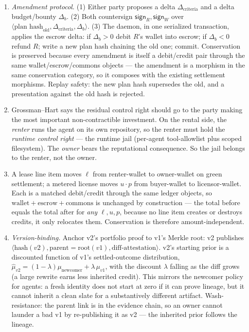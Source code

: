 \begin{enumerate}[label=\textbf{IV.\arabic*},leftmargin=2.8em,itemsep=8pt,topsep=4pt]
\item \wbopen\wbstar \emph{Amendment protocol.} (1) Either party proposes a delta
  $\Delta_{\text{criteria}}$ and a delta budget/bounty $\Delta_b$. (2) Both
  countersign $\mathsf{sign}_R,\mathsf{sign}_W$ over $\langle \text{plan hash}_{\text{old}},
  \Delta_{\text{criteria}}, \Delta_b\rangle$. (3) The daemon, in one serialized
  transaction, applies the escrow delta: if $\Delta_b>0$ debit $R$'s wallet into
  escrow; if $\Delta_b<0$ refund $R$; write a new plan hash chaining the old one;
  commit. Conservation is preserved because every amendment is itself a debit/credit
  pair through the same wallet/escrow/commons objects --- the amendment is a morphism
  in the same conservation category, so it composes with the existing settlement
  morphisms. Replay safety: the new plan hash supersedes the old, and a presentation
  against the old hash is rejected.

\item \wbcheck Grossman--Hart says the residual control right should go to the party
  making the most important non-contractible investment. On the rental side, the
  \emph{renter} runs the agent on its own repository, so the renter must hold the
  \emph{runtime control right} --- the runtime jail (per-agent tool-allowlist plus
  scoped filesystem). The \emph{owner} bears the reputational consequence. So the
  jail belongs to the renter, not the owner.

\item \wbtrace A lease line item moves $\ell$ from renter-wallet to owner-wallet on
  green settlement; a metered license moves $u\cdot p$ from buyer-wallet to
  licensor-wallet. Each is a matched debit/credit through the same ledger objects, so
  $\text{wallet}+\text{escrow}+\text{commons}$ is unchanged by construction --- the
  total before equals the total after for \emph{any} $\ell, u, p$, because no line
  item creates or destroys credits, it only relocates them. Conservation is therefore
  amount-independent.

\item \wbopen\wbstar \emph{Version-binding.} Anchor v2's portfolio proof to v1's
  Merkle root: v2 publishes $\langle \text{hash}(v2), \text{parent}=\text{root}(v1),
  \text{diff-attestation}\rangle$. v2's starting prior is a discounted function of
  v1's settled-outcome distribution, $\hat\mu_{v2}=(1-\lambda)\mu_{\text{newcomer}}
  +\lambda\,\mu_{v1}$, with the discount $\lambda$ falling as the diff grows
  (a large rewrite earns less inherited credit). This mirrors the newcomer policy for
  agents: a fresh identity does not start at zero if it can prove lineage, but it
  cannot inherit a clean slate for a substantively different artifact. Wash-resistance:
  the parent link is in the evidence chain, so an owner cannot launder a bad v1 by
  re-publishing it as v2 --- the inherited prior follows the lineage.


\end{enumerate}
